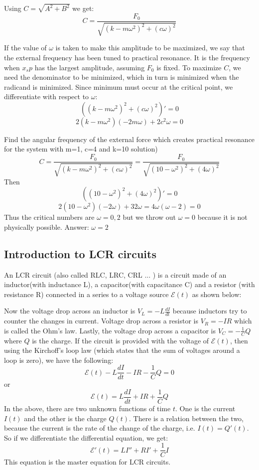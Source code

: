 \documentclass[12pt]{report}
\begin{document}
Using $C = \sqrt{A^2 + B^2} $ we get:
$$C= \frac{F_0}{\sqrt{(k-m\omega^2)^2+(c\omega)^2}}$$

If the value of $\omega$ is taken to make this amplitude to be maximized, we say that the external frequency has been tuned to practical resonance. It is the frequency when $x_sp$ has the largest amplitude, assuming $F_0$ is fixed.
To maximize $C$, we need the denominator to be minimized, which in turn is minimized when the radicand is minimized. Since minimum must occur at the critical point, we differentiate with respect to $\omega$:
$$\left((k-m\omega^2)^2+(c\omega)^2\right)'=0$$
$$2(k-m\omega^2)(-2m\omega)+ 2c^2 \omega =0$$

Find the angular frequency of the external force which creates practical resonance for the system with m=1, c=4 and k=10
solution)
$$C= \frac{F_0}{\sqrt{(k-m\omega^2)^2+(c\omega)^2}}= \frac{F_0}{\sqrt{(10-\omega^2)^2+(4\omega)^2}}$$
Then
$$\left((10-\omega^2)^2+(4\omega)^2\right)'=0$$
$$2(10-\omega^2)(-2\omega)+ 32 \omega =4\omega(\omega-2)=0$$
Thus the critical numbers are $\omega=0,2$ but we throw out $\omega=0$ because it is not physically possible.
Answer: $\omega=2$

\subsection*{Introduction to LCR circuits}

An LCR circuit (also called RLC, LRC, CRL ... ) is a circuit made of an inductor(with inductance L), a capacitor(with capacitance C) and a resistor (with resistance R) connected in a series to a voltage source $\mathcal{E} (t)$ as shown below:
\begin{center}
\end{center}

Now the voltage drop across an inductor is $V_L = -L \frac{dI}{dt}$ because inductors try to counter the changes in current. Voltage drop across a resistor is $V_R= -IR$ which is called the Ohm's law. Lastly, the voltage drop across a capacitor is $V_C = - \frac{1}{C} Q$ where $Q$ is the charge. If the circuit is provided with the voltage of $\mathcal{E} (t)$, then using the Kirchoff's loop law (which states that the sum of voltages around a loop is zero), we have the following:
$$ \mathcal{E} (t)-L \frac{dI}{dt} -IR- \frac{1}{C} Q =0$$
or
$$ \mathcal{E} (t)=L \frac{dI}{dt} +IR + \frac{1}{C} Q $$
In the above, there are two unknown functions of time $t$. One is the current $I(t)$ and the other is the charge $Q(t)$. There is a relation between the two, because the current is the rate of the change of the charge, i.e. $I(t)= Q'(t)$.
So if we differentiate the differential equation, we get:
$$ \mathcal{E}' (t)=L I'' +R I' + \frac{1}{C} I $$
This equation is the master equation for LCR circuits.
\end{document}
